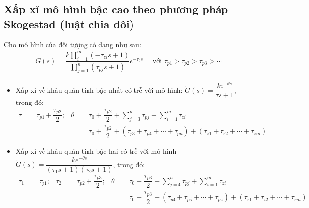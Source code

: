\subsection{Xấp xỉ mô hình bậc cao theo phương pháp Skogestad (luật chia đôi)}
    Cho mô hình của đối tượng có dạng như sau:
    \begin{align*}
        G(s) = \dfrac{\displaystyle k \prod_{i=1}^m \left({-\tau_{zi} s + 1}\right)}{\displaystyle \prod_{j=1}^n \left({\tau_{pj} s + 1}\right)} e^{-\tau_0 s} \quad \textrm{ với } \tau_{p1} > \tau_{p2} > \tau_{p3} > \cdots
    \end{align*}

    \begin{itemize}
        \item Xấp xỉ về khâu quán tính bậc nhất có trễ với mô hình: $\tilde{G}(s) = \dfrac{k e^{-\theta s}}{\tau s + 1}$, trong đó:
            \begin{align*}
                \tau & = \tau_{p1} + \dfrac{\tau_{p2}}{2}; &
                \theta & = \tau_0 + \dfrac{\tau_{p2}}{2} + \sum_{j = 3}^n \tau_{pj} + \sum_{i = 1}^m \tau_{zi} \\
                & & & = \tau_0 + \dfrac{\tau_{p2}}{2} + \left({\tau_{p3} + \tau_{p4} + \cdots + \tau_{pn}}\right) + \left({\tau_{z1} + \tau_{z2} + \cdots + \tau_{zm}}\right)
            \end{align*}

        \item Xấp xỉ về khâu quán tính bậc hai có trễ với mô hình: $\tilde{G}(s) = \dfrac{k e^{-\theta s}}{\left({\tau_1 s + 1}\right) \left({\tau_2 s + 1}\right)}$, trong đó:
            \begin{align*}
                \tau_1 & = \tau_{p1}; & \tau_2 & = \tau_{p2} + \dfrac{\tau_{p3}}{2}; &
                \theta & = \tau_0 + \dfrac{\tau_{p3}}{2} + \sum_{j = 4}^n \tau_{pj} + \sum_{i = 1}^m \tau_{zi} \\
                & & & & & = \tau_0 + \dfrac{\tau_{p3}}{2} + \left({\tau_{p4} + \tau_{p5} + \cdots + \tau_{pn}}\right) + \left({\tau_{z1} + \tau_{z2} + \cdots + \tau_{zm}}\right)
                \end{align*}
    \end{itemize}

